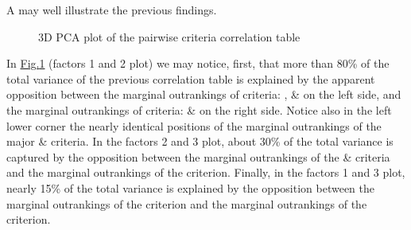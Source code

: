 \documentclass[a4paper,12pt,english]{sphinxhowto}
\begin{document}
A  may well illustrate the previous findings.

\begin{sphinxVerbatim}[commandchars=\\\{\}]
\end{sphinxVerbatim}

\begin{figure}[H]
\centering
\capstart

\noindent{}
\caption{3D PCA plot of the pairwise criteria correlation table}\label{\detokenize{tutorial:thecs3dcorrelation}}\end{figure}

In \hyperref[\detokenize{tutorial:thecs3dcorrelation}]{Fig.\@ \ref{\detokenize{tutorial:thecs3dcorrelation}}} (factors 1 and 2 plot) we may notice, first, that more than 80\% of the total variance of the previous correlation table is explained by the apparent opposition between the marginal outrankings of criteria: ,  \&  on the left side, and the marginal outrankings of criteria:  \&  on the right side. Notice also in the left lower corner the nearly identical positions of the marginal outrankings of the major  \&  criteria. In the factors 2 and 3 plot, about 30\% of the total variance is captured by the opposition between the marginal outrankings of the  \&  criteria and the marginal outrankings of the  criterion. Finally, in the factors 1 and 3 plot, nearly 15\% of the total variance is explained by the opposition between the marginal outrankings of the  criterion and the marginal outrankings of the  criterion.
\end{document}
